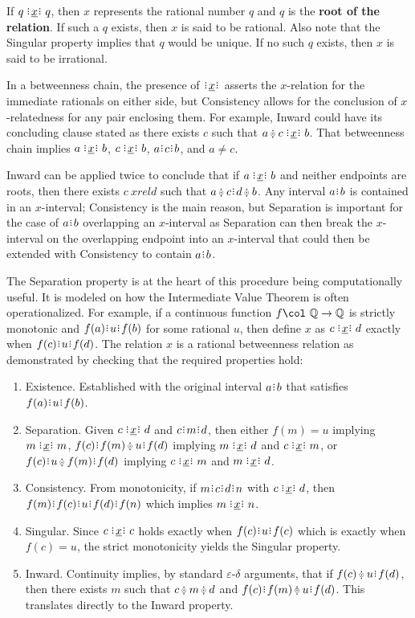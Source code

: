 \documentclass[12pt]{article}
\begin{document}
If $q \xrel q$, then $x$ represents the rational number $q$ and $q$ is the \textbf{root of the relation}.
If such a $q$ exists, then $x$ is said to be rational. Also note that the Singular property implies that $q$ would be unique. If no such $q$ exists, then $x$ is said to be irrational. 

In a betweenness chain, the presence of $\xrel$ asserts the $x$-relation for the immediate rationals on either side, but Consistency allows for the conclusion of $x$-relatedness for any pair enclosing them. For example, Inward could have its concluding clause stated as there exists $c$ such that $a \betneq c \xrel b$. That betweenness chain implies $a \xrel b$, $c \xrel b$, $a \rint c \rint b$, and $a \neq c$.

Inward can be applied twice to conclude that if $a \xrel b$ and neither endpoints are roots, then there exists $c\ xrel d$ such that $a \betneq c \rint d \betneq b$. Any interval $a \rint b$ is contained in an $x$-interval; Consistency is the main reason, but Separation is important for the case of $a \rint b$ overlapping an $x$-interval as Separation can then break the $x$-interval on the overlapping endpoint into an $x$-interval that could then be extended with Consistency to contain $a \rint b$. 

The Separation property is at the heart of this procedure being computationally useful. It is modeled on how the Intermediate Value Theorem is often operationalized. For example, if a continuous function $f \col\  \mathbb{Q} \to \mathbb{Q}$ is strictly monotonic and $f(a) \rint u \rint f(b)$ for some rational $u$, then define $x$ as $c \xrel d$ exactly when  $f(c) \rint u \rint f(d)$. The relation $x$ is a rational betweenness relation as demonstrated by checking that the required properties hold:
\begin{enumerate}
    \item Existence. Established with the original interval $a \rint b$ that satisfies $f(a) \rint u \rint f(b)$.
    \item Separation. Given $c \xrel d$ and $c \rint m \rint d$, then either $f(m) = u$ implying $m \xrel m$, $f(c) \rint f(m) \betneq u \rint f(d)$ implying $m \xrel d$ and \sout{$c \xrel m$}, or $f(c) \rint u \betneq f(m) \rint f(d)$ implying $c \xrel m$ and \sout{$m \xrel d$}.
    \item Consistency. From monotonicity,  if $m \rint c \rint d \rint n$ with $c \xrel d$, then $f(m) \rint f(c) \rint u \rint f(d) \rint f(n)$ which implies $m \xrel n$.
    \item Singular. Since  $c \xrel c$ holds exactly when $f(c) \rint u \rint f(c)$ which is exactly when $f(c) = u$, the strict monotonicity yields the Singular property.
    \item Inward. Continuity implies, by standard $\varepsilon$-$\delta$ arguments, that if $f(c) \betneq u \rint f(d)$, then there exists $m$ such that $c\betneq m \betneq d$ and $f(c) \rint f(m) \betneq u \rint f(d)$. This translates directly to the Inward property. 
\end{enumerate}
\end{document}
